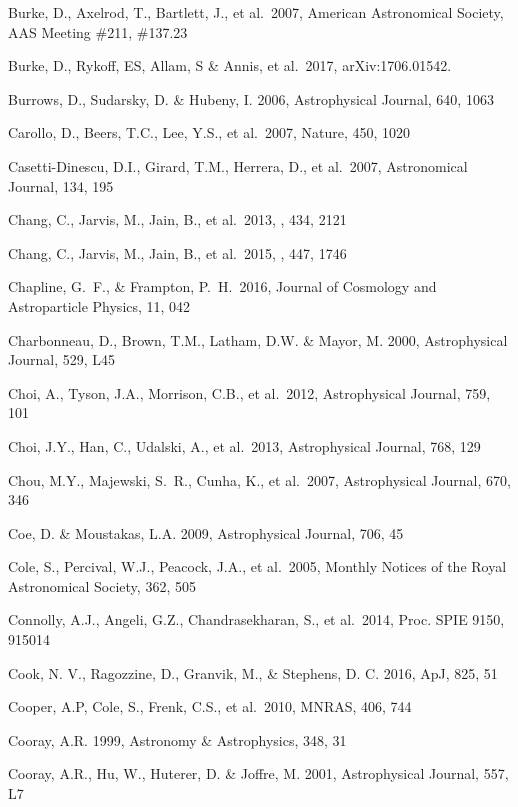 \documentclass[twocolumn]{aastex61}
\begin{document}
\begin{thebibliography}{}
\bibitem[()]{} Burke, D., Axelrod, T., Bartlett, J., et al.~2007,
                      American Astronomical Society, AAS Meeting \#211, \#137.23

\bibitem[()]{} Burke, D., Rykoff, ES, Allam, S \& Annis, et al.~2017, arXiv:1706.01542.

\bibitem[()]{} Burrows, D., Sudarsky, D. \& Hubeny, I. 2006, Astrophysical Journal, 640, 1063

\bibitem[()]{} Carollo, D., Beers, T.C., Lee, Y.S., et al.~2007, Nature, 450, 1020

\bibitem[()]{} Casetti-Dinescu, D.I., Girard, T.M., Herrera, D., et al.~2007, Astronomical Journal, 134, 195

\bibitem[()]{} Chang, C., Jarvis, M., Jain, B., et al.\ 2013, \mnras, 434, 2121

\bibitem[()]{} Chang, C., Jarvis, M., Jain, B., et al.\ 2015, \mnras, 447, 1746

\bibitem[()]{} Chapline, G.~F., \& Frampton, P.~H.\ 2016, Journal of Cosmology and Astroparticle Physics, 11, 042

\bibitem[()]{} Charbonneau, D., Brown, T.M., Latham, D.W. \& Mayor, M. 2000, Astrophysical Journal, 529, L45

\bibitem[()]{} Choi, A., Tyson, J.A., Morrison, C.B., et al.~2012, Astrophysical Journal, 759, 101

\bibitem[()]{} Choi, J.Y., Han, C., Udalski, A., et al.~2013, Astrophysical Journal, 768, 129

\bibitem[()]{} Chou, M.Y., Majewski, S.~R., Cunha, K., et al.~2007, Astrophysical Journal, 670, 346

\bibitem[()]{} Coe, D. \& Moustakas, L.A. 2009, Astrophysical Journal, 706, 45

\bibitem[()]{} Cole, S., Percival, W.J., Peacock, J.A., et al.~2005, Monthly Notices of the Royal
             Astronomical Society, 362, 505

\bibitem[()]{} Connolly, A.J., Angeli, G.Z., Chandrasekharan, S., et al.~2014, Proc. SPIE 9150, 915014

\bibitem[()]{}Cook, N. V., Ragozzine, D., Granvik, M., \& Stephens, D. C. 2016, ApJ, 825, 51

\bibitem[()]{} Cooper, A.P, Cole, S., Frenk, C.S., et al.~2010, MNRAS, 406, 744

\bibitem[()]{} Cooray, A.R. 1999, Astronomy \& Astrophysics, 348, 31

\bibitem[()]{} Cooray, A.R., Hu, W., Huterer, D. \& Joffre, M. 2001, Astrophysical Journal, 557, L7


\end{thebibliography}
\end{document}

